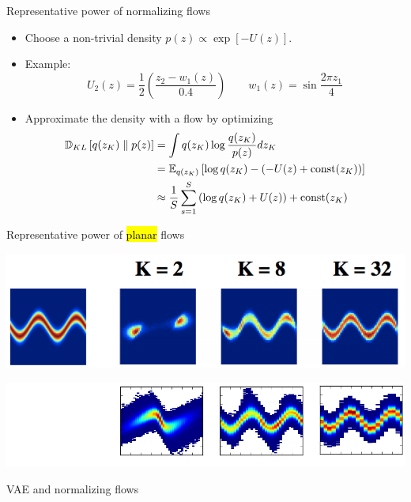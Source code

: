 \documentclass[unicode,11pt]{beamer}
\begin{document}
\begin{frame}{Representative power of normalizing flows}
  \begin{itemize}
  \item Choose a non-trivial density $p(z) \propto \exp[-U(z)]$.
  \item Example:
    $$
    U_2(z) = \frac{1}{2} \left( \frac{z_2 - w_1(z)}{0.4} \right)
    \qquad
    w_1(z) = \sin \frac{2 \pi z_1}{4}
    $$
  \item Approximate the density with a flow by optimizing
    \begin{align*}
      \KL{q(z_K)}{p(z)}
      &= \int q(z_K) \log \frac{q(z_K)}{p(z)} dz_K \\
      &= \E{q(z_K)}{\log q(z_K) - (-U(z) + \op{const}(z_K))} \\
      &\approx \frac{1}{S} \sum\limits_{s = 1}^S \left( \log q(z_K) + U(z) \right) + \op{const}(z_K)
    \end{align*}
  \end{itemize}
\end{frame}


\begin{frame}[fragile]{Representative power of \hl{planar} flows}
  \begin{center}
    \includegraphics[width=.8\textwidth]{images/normalizing_flow}
  \end{center}

  \begin{center}
    \includegraphics[width=.8\textwidth]{images/normalizing_flow1}
  \end{center}
\end{frame}


\begin{frame}{VAE and normalizing flows}
  \centering
\end{frame}
\end{document}
